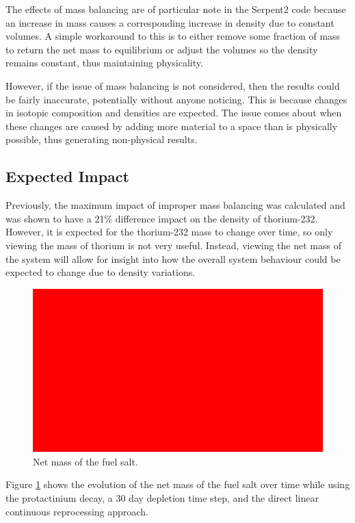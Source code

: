 The effects of mass balancing are of particular note in the Serpent2 code because an increase in mass causes a corresponding increase in density due to constant volumes. A simple workaround to this is to either remove some fraction of mass to return the net mass to equilibrium or adjust the volumes so the density remains constant, thus maintaining physicality.

However, if the issue of mass balancing is not considered, then the results could be fairly inaccurate, potentially without anyone noticing. This is because changes in isotopic composition and densities are expected. The issue comes about when these changes are caused by adding more material to a space than is physically possible, thus generating non-physical results.

\subsection{Expected Impact}

Previously, the maximum impact of improper mass balancing was calculated and was shown to have a 21\% difference impact on the density of thorium-232. However, it is expected for the thorium-232 mass to change over time, so only viewing the mass of thorium is not very useful. Instead, viewing the net mass of the system will allow for insight into how the overall system behaviour could be expected to change due to density variations.

\begin{figure}[H]
  \centering
  \includegraphics[scale=0.1]{images/placeholder.png}
  \caption{Net mass of the fuel salt.}
   \label{fig:net-mass-bal}
\end{figure}

Figure \ref{fig:net-mass-bal} shows the evolution of the net mass of the fuel salt over time while using the protactinium decay, a 30 day depletion time step, and the direct linear continuous reprocessing approach.



